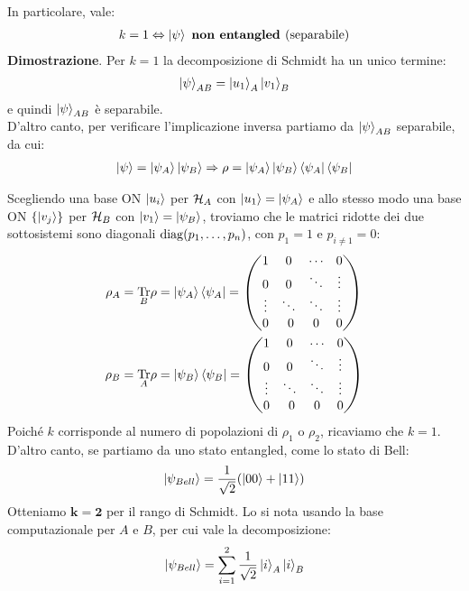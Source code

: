 \documentclass[../../InformazioneQuantistica.tex]{subfiles}
\begin{document}
In particolare, vale:
\begin{align*}
k=1 \Leftrightarrow \Ket{\psi} \text{ \textbf{non entangled }(separabile)}
\end{align*}
\textbf{Dimostrazione}.
Per $k=1$ la decomposizione di Schmidt ha un unico termine:
\begin{align*}
\Ket{\psi}_{AB} = \Ket{u_1}_A\Ket{v_1}_B
\end{align*}
e quindi $\Ket{\psi}_{AB}$ è separabile.\\
D'altro canto, per verificare l'implicazione inversa partiamo da $\Ket{\psi}_{AB}$ separabile, da cui:
\begin{align*}
\Ket{\psi}=\Ket{\psi_A} \Ket{\psi_B} \Rightarrow \rho = \Ket{\psi_A}\Ket{\psi_B} \Bra{\psi_A}\Bra{\psi_B}
\end{align*}

Scegliendo una base ON $\Ket{u_i}$ per $\mathcal{H}_A$ con $\Ket{u_1} = \Ket{\psi_A}$ e allo stesso modo una base ON $\{\Ket{v_j}\}$  per $\mathcal{H}_B$ con $\Ket{v_1} = \Ket{\psi_B}$, troviamo che le matrici ridotte dei due sottosistemi sono diagonali $\operatorname{diag}(p_1, \dots, p_n)$, con $p_1=1$ e $p_{i\neq 1} = 0$:
\begin{align*}
\rho_A &= \underset{B}{\operatorname{Tr}}\rho = \Ket{\psi_A}\Bra{\psi_A}=\begin{pmatrix}
1 & 0 & \cdots & 0\\
0 & 0 & \ddots & \vdots\\
\vdots & \ddots & \ddots & \vdots\\
0 &\ 0 & 0 & 0
\end{pmatrix}\\
\rho_B &= \underset{A}{\operatorname{Tr}}\rho = \Ket{\psi_B}\Bra{\psi_B}=\begin{pmatrix}
1 & 0 & \cdots & 0\\
0 & 0 & \ddots & \vdots\\
\vdots & \ddots & \ddots & \vdots\\
0 &\ 0 & 0 & 0
\end{pmatrix}
\end{align*}
Poiché $k$ corrisponde al numero di popolazioni di $\rho_1$ o $\rho_2$, ricaviamo che $k=1$.\\


D'altro canto, se partiamo da uno stato entangled, come lo stato di Bell: 
\begin{align*}
\Ket{\psi_{Bell}}=\frac{1}{\sqrt{2}}(\Ket{00}+\Ket{11}) 
\end{align*}
Otteniamo $\bm{k=2}$ per il rango di Schmidt. Lo si nota usando la base computazionale per $A$ e $B$, per cui vale la decomposizione:
\begin{align*}
\Ket{\psi_{Bell}} = \sum_{i=1}^2 \frac{1}{\sqrt{2}}\Ket{i}_A \Ket{i}_B
\end{align*}
\end{document}
